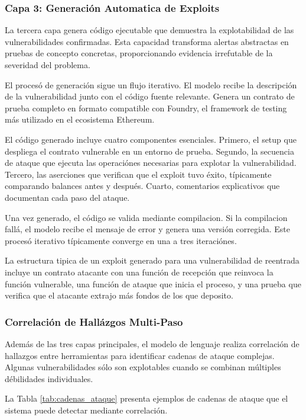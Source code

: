\documentclass[12pt,a4paper,twoside]{book}
\begin{document}
\subsubsection{Capa 3: Generación Automatica de Exploits}

La tercera capa genera código ejecutable que demuestra la explotabilidad de las vulnerabilidades confirmadas. Esta capacidad transforma alertas abstractas en pruebas de concepto concretas, proporcionando evidencia irrefutable de la severidad del problema.

El procesó de generación sigue un flujo iterativo. El modelo recibe la descripción de la vulnerabilidad junto con el código fuente relevante. Genera un contrato de prueba completo en formato compatible con Foundry, el framework de testing más utilizado en el ecosistema Ethereum.

El código generado incluye cuatro componentes esenciales. Primero, el setup que despliega el contrato vulnerable en un entorno de prueba. Segundo, la secuencia de ataque que ejecuta las operaciónes necesarias para explotar la vulnerabilidad. Tercero, las aserciones que verifican que el exploit tuvo éxito, típicamente comparando balances antes y después. Cuarto, comentarios explicativos que documentan cada paso del ataque.

Una vez generado, el código se valida mediante compilacion. Si la compilacion fallá, el modelo recibe el mensaje de error y genera una versión corregida. Este procesó iterativo típicamente converge en una a tres iteraciónes.

La estructura tipica de un exploit generado para una vulnerabilidad de reentrada incluye un contrato atacante con una función de recepción que reinvoca la función vulnerable, una función de ataque que inicia el proceso, y una prueba que verifica que el atacante extrajo más fondos de los que deposito.

\subsubsection{Correlación de Hallázgos Multi-Paso}

Además de las tres capas principales, el modelo de lenguaje realiza correlación de hallazgos entre herramientas para identificar cadenas de ataque complejas. Algunas vulnerabilidades sólo son explotables cuando se combinan múltiples débilidades individuales.

La Tabla \ref{tab:cadenas_ataque} presenta ejemplos de cadenas de ataque que el sistema puede detectar mediante correlación.
\end{document}
